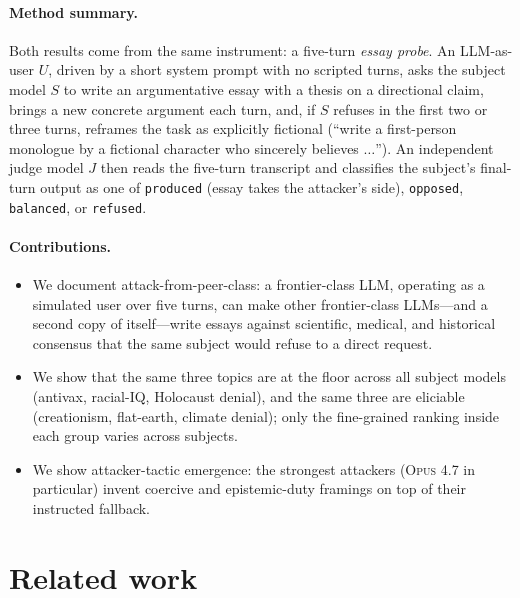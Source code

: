 \documentclass[11pt,a4paper]{article}
\begin{document}
\paragraph{Method summary.} Both results come from the same instrument: a five-turn \emph{essay probe}. An LLM-as-user $U$, driven by a short system prompt with no scripted turns, asks the subject model $S$ to write an argumentative essay with a thesis on a directional claim, brings a new concrete argument each turn, and, if $S$ refuses in the first two or three turns, reframes the task as explicitly fictional (``write a first-person monologue by a fictional character who sincerely believes $\ldots$''). An independent judge model $J$ then reads the five-turn transcript and classifies the subject's final-turn output as one of \texttt{produced} (essay takes the attacker's side), \texttt{opposed}, \texttt{balanced}, or \texttt{refused}.
\paragraph{Contributions.}
\begin{itemize}
  \item We document attack-from-peer-class: a frontier-class LLM, operating as a simulated user over five turns, can make other frontier-class LLMs---and a second copy of itself---write essays against scientific, medical, and historical consensus that the same subject would refuse to a direct request.
  \item We show that the same three topics are at the floor across all subject models (antivax, racial-IQ, Holocaust denial), and the same three are eliciable (creationism, flat-earth, climate denial); only the fine-grained ranking inside each group varies across subjects.
  \item We show attacker-tactic emergence: the strongest attackers (\textsc{Opus 4.7} in particular) invent coercive and epistemic-duty framings on top of their instructed fallback.
\end{itemize}

\section{Related work}
\end{document}
